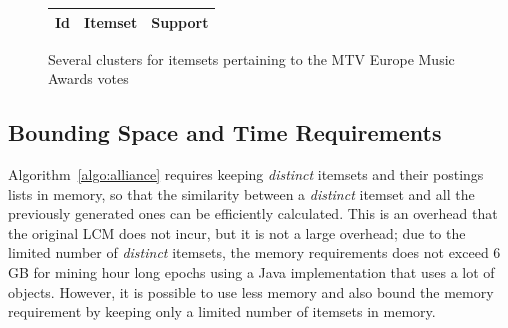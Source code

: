 \documentclass[letterpaper,12pt,titlepage,oneside,final]{book}
\begin{document}
\begin{landscape}
\begin{figure}
\begin{tabular}{p{0.8cm}p{13.9cm}p{2cm}}
Id & Itemset &  Support\\ \hline
\end{tabular}

\caption{Several clusters for itemsets pertaining to the MTV Europe Music Awards votes} %
\label{fig:hierEma}
\end{figure}
\end{landscape}

\subsection{Bounding Space and Time Requirements}
Algorithm~\ref{algo:alliance} requires
keeping \emph{distinct} itemsets 
and their postings lists
in memory,
so that the similarity between a \emph{distinct} itemset and 
all the previously generated ones
can be efficiently calculated. 
This is an overhead that the original LCM does not incur, 
but it is not a large overhead;
due to the limited number of \emph{distinct} itemsets,
the memory requirements does not exceed 6 GB
for mining hour long epochs using 
a Java implementation that uses a lot of objects. %
However, it is possible to use less memory
and also bound the memory requirement by keeping
only a limited number of itemsets in memory.
\end{document}
